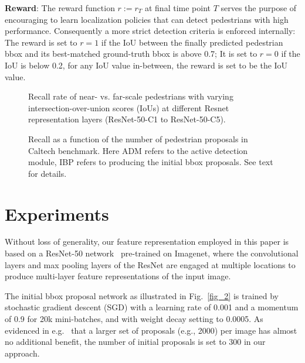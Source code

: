 \documentclass[10pt,journal,compsoc,twoside]{IEEEtran}
\begin{document}
\textbf{Reward}: The reward function $r:=r_T$ at final time point $T$ serves the purpose of encouraging to learn localization policies that can detect pedestrians with high performance. Consequently a more strict detection criteria is enforced internally:
The reward is set to $r = 1$ if the IoU between the finally predicted pedestrian bbox and its best-matched ground-truth bbox is above 0.7; It is set to $r=0$ if the IoU is below 0.2, for any IoU value in-between, the reward is set to be the IoU value.





\begin{figure}[!t]
\centering
{}
\caption{Recall rate of near- vs. far-scale pedestrians with varying intersection-over-union scores (IoUs) at different Resnet representation layers (ResNet-50-C1 to ResNet-50-C5).}
\label{fig_7}
\end{figure}


\begin{figure}[!t]
\centering
{}
\caption{Recall as a function of the number of pedestrian proposals in Caltech benchmark.
Here ADM refers to the active detection module, IBP refers to producing the initial bbox proposals. See text for details.}
\label{fig_AMD}
\end{figure}


\section{Experiments}
Without loss of generality, our feature representation employed in this paper is based on a ResNet-50 network~\cite{HeEtAl:cvpr16} pre-trained on Imagenet,
where the convolutional layers and max pooling layers of the ResNet are engaged at multiple locations to produce multi-layer feature representations of the input image.

The initial bbox proposal network as illustrated in Fig.~\ref{fig_2} is trained by stochastic gradient descent (SGD) with a learning rate of 0.001 and a momentum of 0.9 for 20k mini-batches, and with weight decay setting to 0.0005.
As evidenced in e.g.~\cite{RenEtAl:nips15,DaiEtAl:nips16} that a larger set of proposals (e.g., 2000) per image has almost no additional benefit,
the number of initial proposals is set to 300 in our approach.
\end{document}
